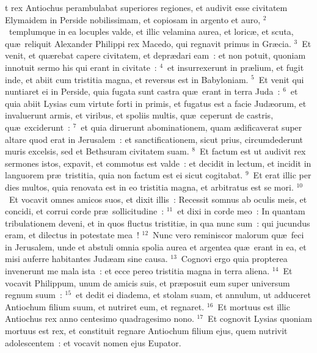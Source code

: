\bchapter
{}t rex Antiochus perambulabat superiores regiones, et audivit esse civitatem Elymaidem in Perside nobilissimam, et copiosam in argento et auro,
${}^{2}$~templumque in ea locuples valde, et illic velamina aurea, et loric\ae , et scuta, qu\ae\ reliquit Alexander Philippi rex Macedo, qui regnavit primus in Gr\ae cia.
${}^{3}$~Et venit, et qu\ae rebat capere civitatem, et depr\ae dari eam~: et non potuit, quoniam innotuit sermo his qui erant in civitate~:
${}^{4}$~et insurrexerunt in pr\ae lium, et fugit inde, et abiit cum tristitia magna, et reversus est in Babyloniam.
${}^{5}$~Et venit qui nuntiaret ei in Perside, quia fugata sunt castra qu\ae\ erant in terra Juda~:
${}^{6}$~et quia abiit Lysias cum virtute forti in primis, et fugatus est a facie Jud\ae orum, et invaluerunt armis, et viribus, et spoliis multis, qu\ae\ ceperunt de castris, qu\ae\ exciderunt~:
${}^{7}$~et quia diruerunt abominationem, quam \ae dificaverat super altare quod erat in Jerusalem~: et sanctificationem, sicut prius, circumdederunt muris excelsis, sed et Bethsuram civitatem suam.
${}^{8}$~Et factum est ut audivit rex sermones istos, expavit, et commotus est valde~: et decidit in lectum, et incidit in languorem pr\ae\ tristitia, quia non factum est ei sicut cogitabat.
${}^{9}$~Et erat illic per dies multos, quia renovata est in eo tristitia magna, et arbitratus est se mori.
${}^{10}$~Et vocavit omnes amicos suos, et dixit illis~: Recessit somnus ab oculis meis, et concidi, et corrui corde pr\ae\ sollicitudine~:
${}^{11}$~et dixi in corde meo~: In quantam tribulationem deveni, et in quos fluctus tristiti\ae , in qua nunc sum~: qui jucundus eram, et dilectus in potestate mea~!
${}^{12}$~Nunc vero reminiscor malorum qu\ae\ feci in Jerusalem, unde et abstuli omnia spolia aurea et argentea qu\ae\ erant in ea, et misi auferre habitantes Jud\ae am sine causa.
${}^{13}$~Cognovi ergo quia propterea invenerunt me mala ista~: et ecce pereo tristitia magna in terra aliena.
${}^{14}$~Et vocavit Philippum, unum de amicis suis, et pr\ae posuit eum super universum regnum suum~:
${}^{15}$~et dedit ei diadema, et stolam suam, et annulum, ut adduceret Antiochum filium suum, et nutriret eum, et regnaret.
${}^{16}$~Et mortuus est illic Antiochus rex anno centesimo quadragesimo nono.
${}^{17}$~Et cognovit Lysias quoniam mortuus est rex, et constituit regnare Antiochum filium ejus, quem nutrivit adolescentem~: et vocavit nomen ejus Eupator.


